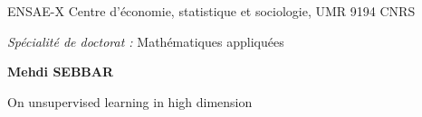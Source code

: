 \documentclass[a4paper,12pt]{book}
\begin{document}
{\begin{center}
ENSAE-X Centre d'\'economie, statistique et sociologie, UMR 9194 CNRS\\
\vspace*{0.2cm}
\end{center}

\begin{center}
{\it Sp\'ecialit\'e de doctorat : } 
{\large Math\'ematiques appliquées}
\end{center}
\vspace{5mm}

\begin{center}
{\large\bf Mehdi SEBBAR}
\end{center}

\vspace{3mm}
 
\begin{center}
{\Large On unsupervised learning in high dimension}
\end{center}


}
\end{document}
